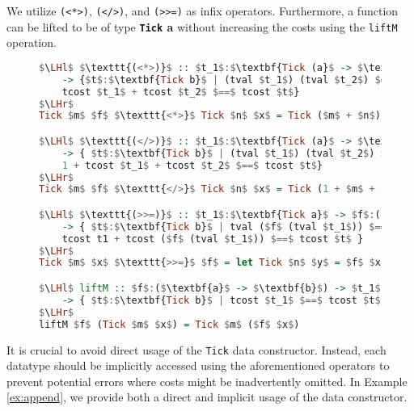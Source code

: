 \documentclass{clmthesis}
\begin{document}
We utilize \texttt{(<*>)}, \texttt{(</>)}, and \texttt{(>>=)} as infix operators. Furthermore, a function can be lifted to be of type \textbf{\lstinline{Tick} a} without increasing the costs using the \texttt{liftM} operation.
\begin{figure}[h]
\begin{lstlisting}[mathescape=true, language=haskell, caption={Operators of the \textbf{\lstinline{Tick} a} datatype.},captionpos=b, label=fig:tick2]
$\LHl$ $\texttt{(<*>)}$ :: $t_1$:$\textbf{Tick (a}$ -> $\textbf{b)}$ -> $t_2$:$\textbf{Tick a}$
	-> {$t$:$\textbf{Tick b}$ |	(tval $t_1$) (tval $t_2$) $==$ tval  $t$ &&
	tcost $t_1$ + tcost $t_2$ $==$ tcost $t$} 
$\LHr$
Tick $m$ $f$ $\texttt{<*>}$ Tick $n$ $x$ = Tick ($m$ + $n$) ($f$ $x$)

$\LHl$ $\texttt{(</>)}$ :: $t_1$:$\textbf{Tick (a}$ -> $\textbf{b)}$ -> $t_2$:$\textbf{Tick a}$
  	-> { $t$:$\textbf{Tick b}$ | (tval $t_1$) (tval $t_2$) $==$ tval  $t$ &&
  	1 + tcost $t_1$ + tcost $t_2$ $==$ tcost $t$}
$\LHr$
Tick $m$ $f$ $\texttt{</>}$ Tick $n$ $x$ = Tick (1 + $m$ + $n$) ($f$ $x$)

$\LHl$ $\texttt{(>>=)}$ :: $t_1$:$\textbf{Tick a}$ -> $f$:($\textbf{a}$ -> $\textbf{Tick b}$)
	-> { $t$:$\textbf{Tick b}$ | tval ($f$ (tval $t_1$)) $==$ tval  $t$ &&
	tcost t1 + tcost ($f$ (tval $t_1$)) $==$ tcost $t$ }
$\LHr$
Tick $m$ $x$ $\texttt{>>=}$ $f$ = let Tick $n$ $y$ = $f$ $x$ in Tick ($m$ + $n$) $y$

$\LHl$ liftM :: $f$:($\textbf{a}$ -> $\textbf{b}$) -> $t_1$:$\textbf{Tick a}$ 
  	-> { $t$:$\textbf{Tick b}$ | tcost $t_1$ $==$ tcost $t$} 
$\LHr$
liftM $f$ (Tick $m$ $x$) = Tick $m$ ($f$ $x$)
\end{lstlisting}
\end{figure}

It is crucial to avoid direct usage of the \lstinline{Tick} data constructor. Instead, each datatype should be implicitly accessed using the aforementioned operators to prevent potential errors where costs might be inadvertently omitted. In Example \ref{ex:append}, we provide both a direct and implicit usage of the data constructor.
\FloatBarrier
\end{document}
